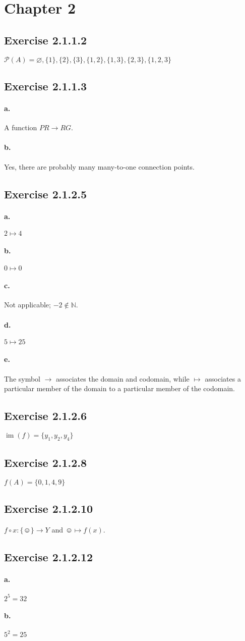 \documentclass[14pt]{article}
\newcommand{\exercise}[1] {\subsection*{Exercise #1}}
\let\emptyset\varnothing{}
\begin{document}
\section*{Chapter 2}


\exercise{2.1.1.2}
$\mathcal{P}(A) = \emptyset, \{1\}, \{2\}, \{3\}, \{1,2\}, \{1,3\}, \{2,3\}, \{1,2,3\}$


\exercise{2.1.1.3}
\paragraph{a.}
A function $PR \to RG$.
\paragraph{b.}
Yes, there are probably many many-to-one connection points.


\exercise{2.1.2.5}
\paragraph{a.}
$2 \mapsto 4$
\paragraph{b.}
$0 \mapsto 0$
\paragraph{c.}
Not applicable; $-2 \not\in \mathbb{N}$.
\paragraph{d.}
$5 \mapsto 25$
\paragraph{e.}
The symbol $\to$ associates the domain and codomain, while $\mapsto$
associates a particular member of the domain to a particular member of
the codomain.


\exercise{2.1.2.6}
$\operatorname{im}(f) = \{y_1, y_2, y_4\}$


\exercise{2.1.2.8}
$f(A) = \{0,1,4,9\}$


\exercise{2.1.2.10}
$f \circ x \colon \{\smiley\} \to Y$ and $\smiley \mapsto f(x)$.


\exercise{2.1.2.12}
\paragraph{a.}
$2^5 = 32$
\paragraph{b.}
$5^2 = 25$
\end{document}
